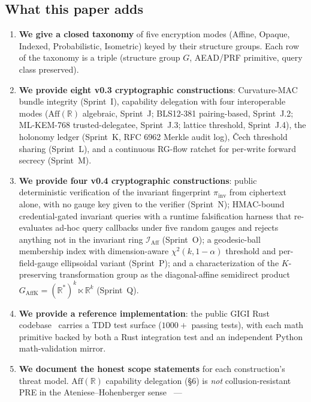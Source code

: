 \documentclass[11pt,letterpaper]{article}
\begin{document}
\subsection{What this paper adds}
\label{sec:intro:adds}

\begin{enumerate}[nosep]
\item \textbf{We give a closed taxonomy} of five encryption modes
  (Affine, Opaque, Indexed, Probabilistic, Isometric) keyed by their
  structure groups. Each row of the taxonomy is a triple (structure
  group $G$, AEAD/PRF primitive, query class preserved).
\item \textbf{We provide eight v0.3 cryptographic constructions}:
  Curvature-MAC bundle integrity (Sprint~I), capability delegation
  with four interoperable modes
  ($\mathrm{Aff}(\mathbb{R})$ algebraic, Sprint~J;
  BLS12-381 pairing-based, Sprint~J.2;
  ML-KEM-768 trusted-delegatee, Sprint~J.3;
  lattice threshold, Sprint~J.4),
  the holonomy ledger (Sprint~K, RFC 6962 Merkle audit log),
  \v{C}ech threshold sharing (Sprint~L), and a continuous RG-flow
  ratchet for per-write forward secrecy (Sprint~M).
\item \textbf{We provide four v0.4 cryptographic constructions}:
  public deterministic verification of the invariant fingerprint
  $\pi_{\mathrm{inv}}$ from ciphertext alone, with no gauge key
  given to the verifier (Sprint~N);
  HMAC-bound credential-gated invariant queries with a runtime
  falsification harness that re-evaluates ad-hoc query callbacks
  under five random gauges and rejects anything not in the
  invariant ring $\mathcal{I}_{\mathrm{Aff}}$ (Sprint~O);
  a geodesic-ball membership index with dimension-aware
  $\chi^2(k, 1-\alpha)$ threshold and per-field-gauge ellipsoidal
  variant (Sprint~P); and a characterization of the
  $K$-preserving transformation group as the diagonal-affine
  semidirect product $G_{\mathrm{AffK}} = (\mathbb{R}^*)^k \ltimes
  \mathbb{R}^k$ (Sprint~Q).
\item \textbf{We provide a reference implementation}: the public
  GIGI Rust codebase~\cite{gigi2026code} carries a TDD test
  surface ($1000+$ passing tests), with each math primitive
  backed by both a Rust integration test and an independent
  Python math-validation mirror.
\item \textbf{We document the honest scope statements} for each
  construction's threat model. $\mathrm{Aff}(\mathbb{R})$ capability delegation
  (\S 6) is \emph{not} collusion-resistant PRE in the
  Ateniese--Hohenberger sense~\cite{ateniese2005pre,libert2008pre} ---

\end{enumerate}
\end{document}
